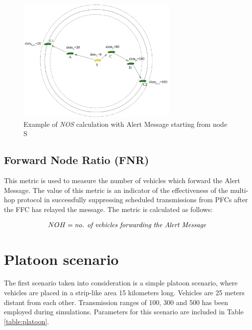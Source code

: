 			\begin{figure}[H]
				\centering
				\includegraphics[width=0.7\textwidth]{immagini/slots}
				\caption{Example of \textit{NOS} calculation with Alert Message starting from node S}
				\label{fig:slots}
			\end{figure}
			
			
		\subsection{Forward Node Ratio (FNR)}
			This metric is used to measure the number of vehicles which forward the Alert Message. The value of this metric is an indicator of the effectiveness of the multi-hop protocol in successfully suppressing scheduled transmissions from PFCs after the FFC has relayed the message. The metric is calculated as follows:
			 
			\begin{gather}
				\label{eq:nos}
				NOH = \textrm{\textit{no. of vehicles forwarding the Alert Message}}
			\end{gather}	
				
	\section{Platoon scenario}
		The first scenario taken into consideration is a simple platoon scenario, where vehicles are placed in a strip-like area 15 kilometers long. Vehicles are 25 meters distant from each other.  Transmission ranges of 100, 300 and 500 has been employed during simulations. 
		Parameters for this scenario are included in Table \ref{table:platoon}.  
		

